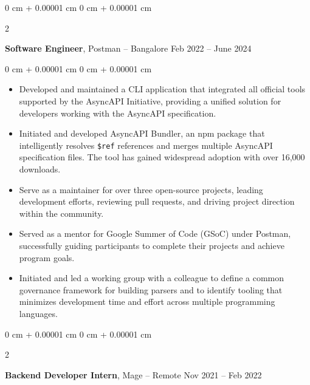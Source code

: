 \documentclass[10pt, letterpaper]{article}
\newenvironment{highlights}{
    \begin{itemize}[
        topsep=0.10 cm,
        parsep=0.10 cm,
        partopsep=0pt,
        itemsep=0pt,
        leftmargin=0 cm + 10pt
    ]
}{
    \end{itemize}
} %
\newenvironment{onecolentry}{
    \begin{adjustwidth}{
        0 cm + 0.00001 cm
    }{
        0 cm + 0.00001 cm
    }
}{
    \end{adjustwidth}
} %
\newenvironment{twocolentry}[2][]{
    \onecolentry
    \def\secondColumn{#2}
    \setcolumnwidth{\fill, 4.5 cm}
    \begin{paracol}{2}
}{
    \switchcolumn \raggedleft \secondColumn
    \end{paracol}
    \endonecolentry
} %
\begin{document}
        \begin{twocolentry}{
            Feb 2022 – June 2024
        }
            \textbf{Software Engineer}, Postman -- Bangalore\end{twocolentry}

        \vspace{0.10 cm}
        \begin{onecolentry}
            \begin{highlights}
                \item Developed and maintained a CLI application that integrated all official tools supported by the AsyncAPI Initiative, providing a unified solution for developers working with the AsyncAPI specification.
                
                \item Initiated and developed AsyncAPI Bundler, an npm package that intelligently resolves \texttt{\$ref} references and merges multiple AsyncAPI specification files. The tool has gained widespread adoption with over 16,000 downloads.

                \item Serve as a maintainer for over three open-source projects, leading development efforts, reviewing pull requests, and driving project direction within the community.

                \item Served as a mentor for Google Summer of Code (GSoC) under Postman, successfully guiding participants to complete their projects and achieve program goals.

                \item Initiated and led a working group with a colleague to define a common governance framework for building parsers and to identify tooling that minimizes development time and effort across multiple programming languages.
                
                
            \end{highlights}
        \end{onecolentry}

        \vspace{0.2 cm}

        \begin{twocolentry}{
            Nov 2021 – Feb 2022
        }
            \textbf{Backend Developer Intern}, Mage -- Remote\end{twocolentry}
\end{document}

